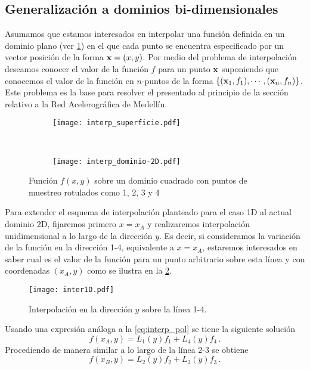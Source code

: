 \subsection{Generalización a dominios bi-dimensionales}
Asumamos que estamos interesados en interpolar una función definida en un 
dominio plano (ver \cref{fig:interp_2D}) en el que cada punto se encuentra 
especificado por un vector posición de la forma $\vb{x} = (x, y)$. Por medio 
del problema de interpolación deseamos conocer el valor de la función $f$ para 
un punto $\vb{x}$ suponiendo que conocemos el valor de la función en $n$-puntos 
de la forma $\{(\vb{x}_1, f_1),\cdots,(\vb{x}_n, f_n)\}$. Este problema es la base para resolver el presentado al principio de la sección relativo a la Red Acelerográfica de Medellín.

\begin{figure}[H]
\centering
	\begin{subfigure}[b]{2.5 in}
		\texttt{[image: interp\_superficie.pdf]}
	\end{subfigure}\,
%
	\begin{subfigure}[b]{2.5 in}
		\texttt{[image: interp\_dominio-2D.pdf]}
	\end{subfigure}
\caption{Función $f(x,y)$ sobre un dominio cuadrado con puntos de muestreo rotulados como 1, 2, 3 y 4}
\label{fig:interp_2D}
\end{figure}

Para extender el esquema de interpolación planteado para el caso 1D al actual 
dominio 2D, fijaremos primero $x = x_A$ y realizaremos interpolación 
unidimensional a lo largo de la dirección $y$. Es decir, si consideramos la 
variación de la función en la dirección 1-4, equivalente a $x = x_A$, estaremos 
interesados en saber cual es el valor de la función para un punto arbitrario 
sobre esta línea y con coordenadas $(x_A,y)$ como se ilustra en la 
\cref{fig:interp_1D}.

\begin{figure}[H]
\centering
\texttt{[image: inter1D.pdf]}
\caption{Interpolación en la dirección $y$ sobre la línea 1-4.}
\label{fig:interp_1D}
\end{figure}

Usando una expresión análoga a la \cref{eq:interp_pol} se tiene la siguiente solución
\[f(x_A,y) = L_1(y)f_1 + L_4(y)f_4\, .\]
Procediendo de manera similar a lo largo de la línea 2-3 se obtiene
\[f(x_B,y) = L_2(y)f_2 + L_3(y)f_3\, .\]

